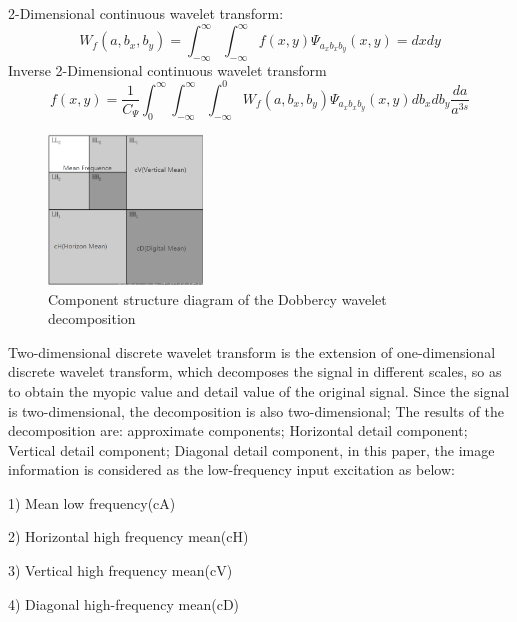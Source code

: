 \documentclass{apmcmthesis}
\begin{document}
2-Dimensional continuous wavelet transform:
\begin{equation}
	\tag{6-2-9}
	W_{f}(a,b_{x},b_{y}) = \int^{\infty}_{-\infty}\int^{\infty}_{-\infty}f(x,y)\Psi_{a_{x}b_{x}b_{y}}(x,y) = dxdy
\end{equation}
Inverse 2-Dimensional continuous wavelet transform
\begin{equation}
	\tag{6-2-10}
	f(x,y) = \frac{1}{C_\Psi}\int^{\infty}_{0}\int^{\infty}_{-\infty}\int^{0}_{-\infty}W_{f}(a,b_{x},b_{y})\Psi_{a_{x}b_{x}b_{y}}(x,y)db_{x} db_{y}\frac{da}{a^{3s}}
\end{equation}	
\begin{figure}[htbp!]
	\centering
	\includegraphics[height=4cm]{./figures/6-2-10.png}
	\caption{Component structure diagram of the Dobbercy wavelet decomposition}
	\label{fig:9}
\end{figure}
Two-dimensional discrete wavelet transform is the extension of one-dimensional discrete wavelet transform, which decomposes the signal in different scales, so as to obtain the myopic value and detail value of the original signal. Since the signal is two-dimensional, the decomposition is also two-dimensional; The results of the decomposition are: approximate components; Horizontal detail component; Vertical detail component; Diagonal detail component, in this paper, the image information is considered as the low-frequency input excitation as below:

1) Mean low frequency(cA)

2) Horizontal high frequency mean(cH)

3) Vertical high frequency mean(cV)

4) Diagonal high-frequency mean(cD)
\end{document}
